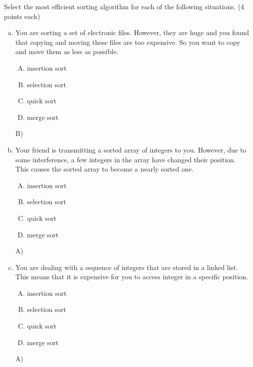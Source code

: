 \documentclass[11pt]{exam}
\begin{document}
Select the most efficient sorting algorithm for each of the following situations. (4 points each)
\begin{enumerate}[(a)]
    \item You are sorting a set of electronic files. However, they are huge and you found that copying and moving these files are too expensive. So you want to copy and move them as less as possible.
    \begin{enumerate}[A)]
        \item insertion sort
        \item selection sort
        \item quick sort
        \item merge sort
    \end{enumerate}
    \begin{solution}
        B)
    \end{solution}
    
    \item Your friend is transmitting a sorted array of integers to you. However, due to some interference, a few integers in the array have changed their position. This causes the sorted array to become a nearly sorted one.
    \begin{enumerate}[A)]
        \item insertion sort
        \item selection sort
        \item quick sort
        \item merge sort
    \end{enumerate}
    \begin{solution}
       A)
    \end{solution}
    
    \item You are dealing with a sequence of integers that are stored in a linked list. This means that it is expensive for you to access integer in a specific position.
    \begin{enumerate}[A)]
        \item insertion sort
        \item selection sort
        \item quick sort
        \item merge sort
    \end{enumerate}
    \begin{solution}
        A)
    \end{solution}
    

\end{enumerate}
\end{document}
